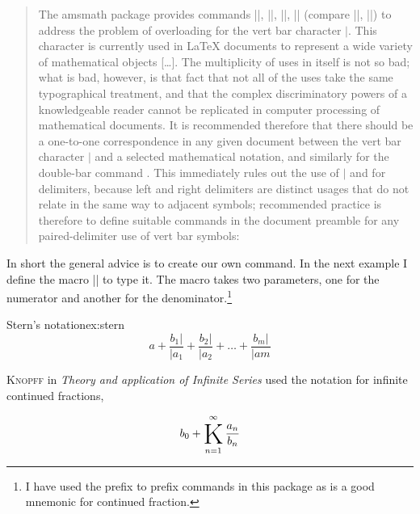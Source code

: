 {\begin{quote}
The amsmath package provides commands |\lvert|, |\rvert|, |\lVert|, |\rVert| (compare |\langle|, |\rangle|) to address the problem of overloading for the vert bar character $\vert$. This character is currently used in LaTeX documents to represent a wide variety of mathematical objects [\ldots]. The multiplicity of uses in itself is not so bad; what is bad, however, is that fact that not all of the uses take the same typographical treatment, and that the complex discriminatory powers of a knowledgeable reader cannot be replicated in computer processing of mathematical documents. It is recommended therefore that there should be a one-to-one correspondence in any given document between the vert bar character $\vert$ and a selected mathematical notation, and similarly for the double-bar command \cs{|}. This immediately rules out the use of $\vert$ and \cs{|} for delimiters, because left and right delimiters are distinct usages that do not relate in the same way to adjacent symbols; recommended practice is therefore to define suitable commands in the document preamble for any paired-delimiter use of vert bar symbols:
\end{quote}
In short the general advice is to create our own command.
In the next example I define the macro |\cfracc| to type it. The macro takes two parameters, one for the numerator and another for the denominator.\footnote{I have used the prefix  to prefix commands in this package as is a good mnemonic for continued fraction.}

\begin{texexample}{Stern's notation}{ex:stern}
\def\cfvertsymbol{\lvert}
\def\cfracc#1#2{\dfrac{#1\cfvertsymbol}{\cfvertsymbol#2}}
\[
a + \dfrac{b_1\vert}{\vert a_1} + \cfracc{b_2}{a_2} +\dots+ \cfracc{b_m}{am}
\]
\end{texexample}



\textsc{Knopff} in \emph{Theory and application of Infinite Series} used the notation for infinite continued fractions,
\newcommand{\cfK}{%
  \mathop{ %
    \mathchoice{\docfK\Huge}
               {\docfK\Huge}
               {\docfK\Huge}
               {\docfK\huge}
    }\displaylimits %
}

\newcommand{\docfK}[1]{%
  \vcenter{#1\kern.2ex\hbox{$\mathrm{K}$}\kern.2ex}}
  
\begin{gather}
b_0 + \cfK_{n=1}^{\infty} \dfrac{a_n}{b_n}
\end{gather}

}
